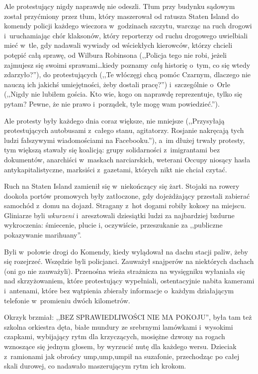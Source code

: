 \documentclass[oneside,polish,11pt,sfheadings]{mwbk}
\begin{document}
Ale protestujący nigdy naprawdę nie odeszli. Tłum przy budynku sądowym
został przyćmiony przez tłum, który maszerował od ratusza Staten Island
do komendy policji każdego wieczora w~godzinach szczytu, warcząc na ruch
drogowi i~uruchamiając chór klaksonów, który reporterzy od ruchu
drogowego uwielbiali mieć w~tle, gdy nadawali wywiady od wściekłych
kierowców, którzy chcieli potępić całą sprawę, od Wilbura Robinsona
(,,Policja tego nie robi, jeżeli zajmujesz się swoimi sprawami\ldots  kiedy
poznamy \textit{całą} historię o~tym, co się wtedy zdarzyło?''), do
protestujących (,,Te włóczęgi chcą pomóc Czarnym, dlaczego nie nauczą
ich jakichś umiejętności, żeby dostali pracę?'') i~szczególnie o~Orle
(,,Nigdy nie lubiłem gościa. Kto wie, kogo on naprawdę reprezentuje,
tylko się pytam? Pewne, że nie prawo i~porządek, tyle mogę wam
powiedzieć.'').

Ale protesty były każdego dnia coraz większe, nie mniejsze (,,Przysyłają
protestujących autobusami z~całego stanu, agitatorzy. Rosjanie nakręcają
tych ludzi fałszywymi wiadomościami na Facebooku.''), a~im dłużej trwały
protesty, tym większą stawały się koalicją: grupy solidarności z~imigrantami bez dokumentów, anarchiści w~maskach narciarskich, weterani
Occupy niosący hasła antykapitalistyczne, marksiści z~gazetami, których
nikt nie chciał czytać.

Ruch na Staten Island zamienił się w~niekończący się żart. Stojaki na
rowery dookoła portów promowych były zatłoczone, gdy dojeżdżający
przestali zabierać samochód z~domu na dojazd. Stragany z~hot dogami
robiły kokosy na miejscu. Gliniarze byli \textit{wkurzeni} i~aresztowali
dziesiątki ludzi za najbardziej bzdurne wykroczenia: śmiecenie, plucie
i, oczywiście, przeszukanie za ,,publiczne pokazywanie marihuany''.

Byli w~połowie drogi do Komendy, kiedy wylądował na dachu stacji paliw,
żeby się rozejrzeć. Wszędzie byli policjanci. Zauważył snajperów na
niektórych dachach (oni go nie zauważyli). Przenośna wieża strażnicza na
wysięgniku wyłaniała się nad skrzyżowaniem, które protestujący
wypełniali, ostentacyjnie nabita kamerami i~antenami, które bez
wątpienia zbierały informacje o~każdym działającym telefonie w~promieniu
dwóch kilometrów.

Okrzyk brzmiał: ,,BEZ SPRAWIEDLIWOŚCI NIE MA POKOJU'', była tam też
szkolna orkiestra dęta, białe mundury ze srebrnymi lamówkami i~wysokimi
czapkami, wybijający rytm dla krzyczących, mosiężne dzwony na rogach
wznoszące się jednym głosem, by wyrzucić nutę dla każdego wersu.
Dzieciak z~ramionami jak obrońcy ump,ump,umpił na suzafonie, przechodząc
po całej skali durowej, co nadawało maszerującym rytm ich krokom.
\end{document}
